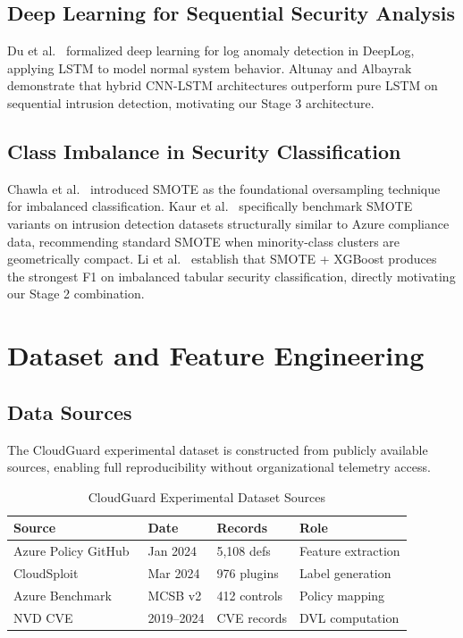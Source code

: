 \documentclass[conference]{IEEEtran}
\begin{document}
\subsection{Deep Learning for Sequential Security Analysis}
Du et al.~\cite{du2017} formalized deep learning for log anomaly 
detection in DeepLog, applying LSTM to model normal system behavior. 
Altunay and Albayrak~\cite{altunay2023} demonstrate that hybrid 
CNN-LSTM architectures outperform pure LSTM on sequential intrusion 
detection, motivating our Stage 3 architecture.

\subsection{Class Imbalance in Security Classification}
Chawla et al.~\cite{chawla2002} introduced SMOTE as the foundational 
oversampling technique for imbalanced classification. Kaur 
et al.~\cite{kaur2024} specifically benchmark SMOTE variants on 
intrusion detection datasets structurally similar to Azure compliance 
data, recommending standard SMOTE when minority-class clusters are 
geometrically compact. Li et al.~\cite{li2023} establish that 
SMOTE + XGBoost produces the strongest F1 on imbalanced tabular 
security classification, directly motivating our Stage 2 combination.

\section{Dataset and Feature Engineering}

\subsection{Data Sources}
The CloudGuard experimental dataset is constructed from publicly 
available sources, enabling full reproducibility without 
organizational telemetry access.

\begin{table}[htbp]
\caption{CloudGuard Experimental Dataset Sources}
\label{tab:datasets}
\centering
\small
\begin{tabular}{p{2.0cm}p{1.5cm}p{1.3cm}p{2.0cm}}
\toprule
\textbf{Source} & \textbf{Date} & \textbf{Records} & \textbf{Role} \\
\midrule
Azure Policy GitHub~\cite{azurepolicy2024} & Jan 2024 & 5,108 defs & Feature extraction \\
CloudSploit~\cite{cloudsploit2024} & Mar 2024 & 976 plugins & Label generation \\
Azure Benchmark~\cite{microsoft2024mcsb} & MCSB v2 & 412 controls & Policy mapping \\
NVD CVE~\cite{nist2024} & 2019--2024 & CVE records & DVL computation \\
\bottomrule
\end{tabular}
\end{table}
\end{document}
